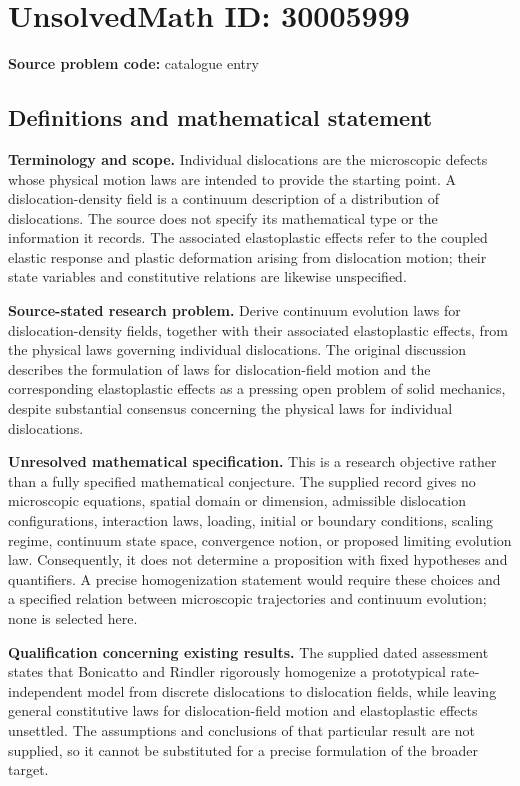 \documentclass[11pt]{article}
\begin{document}
\section*{UnsolvedMath ID: 30005999}
\textbf{Source problem code:} catalogue entry
\subsection{Definitions and mathematical statement}
\textbf{Terminology and scope.} Individual dislocations are the microscopic defects whose physical motion laws are intended to provide the starting point. A dislocation-density field is a continuum description of a distribution of dislocations. The source does not specify its mathematical type or the information it records. The associated elastoplastic effects refer to the coupled elastic response and plastic deformation arising from dislocation motion; their state variables and constitutive relations are likewise unspecified.

\textbf{Source-stated research problem.} Derive continuum evolution laws for dislocation-density fields, together with their associated elastoplastic effects, from the physical laws governing individual dislocations. The original discussion describes the formulation of laws for dislocation-field motion and the corresponding elastoplastic effects as a pressing open problem of solid mechanics, despite substantial consensus concerning the physical laws for individual dislocations.

\textbf{Unresolved mathematical specification.} This is a research objective rather than a fully specified mathematical conjecture. The supplied record gives no microscopic equations, spatial domain or dimension, admissible dislocation configurations, interaction laws, loading, initial or boundary conditions, scaling regime, continuum state space, convergence notion, or proposed limiting evolution law. Consequently, it does not determine a proposition with fixed hypotheses and quantifiers. A precise homogenization statement would require these choices and a specified relation between microscopic trajectories and continuum evolution; none is selected here.

\textbf{Qualification concerning existing results.} The supplied dated assessment states that Bonicatto and Rindler rigorously homogenize a prototypical rate-independent model from discrete dislocations to dislocation fields, while leaving general constitutive laws for dislocation-field motion and elastoplastic effects unsettled. The assumptions and conclusions of that particular result are not supplied, so it cannot be substituted for a precise formulation of the broader target.
\end{document}
